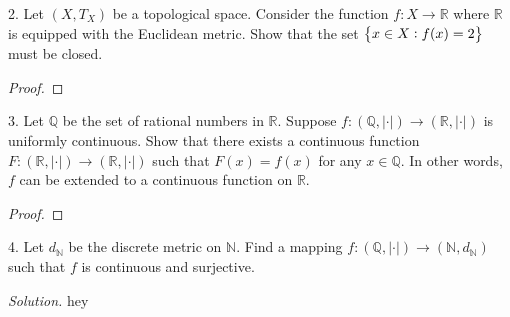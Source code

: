 \documentclass{article}
\newcommand{\N}{\mathbb{N}}
\newcommand{\Q}{\mathbb{Q}}
\newcommand{\R}{\mathbb{R}}
\begin{document}
\newpage

2. Let $(X, T_X)$ be a topological space. Consider the function $f: X
   \to \R$ where $\R$ is equipped with the Euclidean metric. Show that
   the set $\cbr{x \in X : f(x) = 2}$ must be closed.

\begin{proof}

\end{proof}

\newpage

3. Let $\Q$ be the set of rational numbers in $\R$. Suppose $f: (\Q,
   |\cdot|) \to (\R, |\cdot|)$ is uniformly continuous. Show that there
   exists a continuous function $F: (\R, |\cdot|) \to (\R, |\cdot|)$
   such that $F(x) = f(x)$ for any $x \in \mathbb{Q}$. In other words,
   $f$ can be extended to a continuous function on $\R$.

\begin{proof}

\end{proof}

\newpage

4. Let $d_\N$ be the discrete metric on $\N$. Find a mapping $f: (\Q,
   |\cdot|) \to (\N, d_\N)$ such that $f$ is continuous and surjective.

\textit{Solution.}
hey
\end{document}
